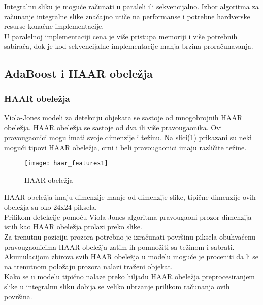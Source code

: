 Integralnu sliku je moguće računati u paraleli ili
sekvencijalno. Izbor algoritma za računanje integralne slike značajno utiče na
performanse i potrebne hardverske resurse konačne implementacije. \\
U paralelnoj implementaciji cena je više pristupa memoriji i više potrebnih sabirača, dok je kod sekvencijalne
implementacije manja brzina proračunavanja. \\

\subsection{AdaBoost i HAAR obeležja}

\subsubsection{HAAR obeležja} \label{haar_features_sec}

Viola-Jones modeli za detekciju objekata se sastoje od mnogobrojnih HAAR obeležja.
HAAR obeležja se sastoje od dva ili više pravougaonika.
Ovi pravougaonici mogu imati svoje dimenzije i težinu.
Na slici(\ref{haar_features_img1}) prikazani su neki mogući tipovi HAAR
obeležja, crni i beli pravougaonici imaju različite težine.

\begin{figure}[H]
  \centering
  \texttt{[image: haar\_features1]}
  \caption{HAAR obeležja \cite{Jensen2008ImplementingTV}}
  \label{haar_features_img1}
\end{figure}

HAAR obeležja imaju dimenzije manje od dimenzije slike, tipične dimenzije ovih
obeležja su oko 24x24 piksela. \\
Prilikom detekcije pomoću Viola-Jones algoritma pravougaoni prozor dimenzija
istih kao HAAR obeležja prolazi preko slike. \\
Za trenutnu poziciju prozora potrebno je izračunati površinu piksela obuhvaćenu
pravougaonicima HAAR obeležja zatim ih pomnožiti sa težinom i sabrati. \\
Akumulacijom zbirova svih HAAR obeležja u modelu moguće je proceniti da li se na trenutnom položaju
prozora nalazi traženi objekat. \\

Kako se u modelu tipično nalaze preko hiljadu HAAR obeležja preprocesiranjem
slike u integralnu sliku dobija se veliko ubrzanje prilikom računanja ovih
površina. \\


